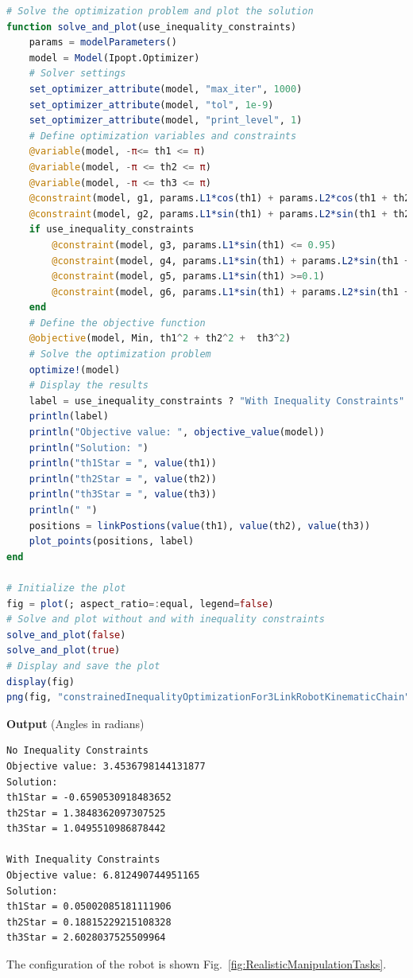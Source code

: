 \begin{lstlisting}[language=Julia,style=mystyle]
# Solve the optimization problem and plot the solution
function solve_and_plot(use_inequality_constraints)
    params = modelParameters()
    model = Model(Ipopt.Optimizer)
    # Solver settings
    set_optimizer_attribute(model, "max_iter", 1000)
    set_optimizer_attribute(model, "tol", 1e-9)
    set_optimizer_attribute(model, "print_level", 1)
    # Define optimization variables and constraints
    @variable(model, -π<= th1 <= π)
    @variable(model, -π <= th2 <= π)
    @variable(model, -π <= th3 <= π)
    @constraint(model, g1, params.L1*cos(th1) + params.L2*cos(th1 + th2) + params.L3*cos(th1 + th2 + th3) - 2.5 == 0)
    @constraint(model, g2, params.L1*sin(th1) + params.L2*sin(th1 + th2) + params.L3*sin(th1 + th2 + th3) - 0.75 == 0)
    if use_inequality_constraints
        @constraint(model, g3, params.L1*sin(th1) <= 0.95)
        @constraint(model, g4, params.L1*sin(th1) + params.L2*sin(th1 + th2) <= 0.95)
        @constraint(model, g5, params.L1*sin(th1) >=0.1)
        @constraint(model, g6, params.L1*sin(th1) + params.L2*sin(th1 + th2) >=0.1)
    end
    # Define the objective function
    @objective(model, Min, th1^2 + th2^2 +  th3^2)
    # Solve the optimization problem
    optimize!(model)
    # Display the results
    label = use_inequality_constraints ? "With Inequality Constraints" : "No Inequality Constraints"
    println(label) 
    println("Objective value: ", objective_value(model))
    println("Solution: ")
    println("th1Star = ", value(th1))
    println("th2Star = ", value(th2))
    println("th3Star = ", value(th3))
    println(" ")            
    positions = linkPostions(value(th1), value(th2), value(th3))
    plot_points(positions, label)
end

# Initialize the plot
fig = plot(; aspect_ratio=:equal, legend=false)
# Solve and plot without and with inequality constraints
solve_and_plot(false)
solve_and_plot(true)
# Display and save the plot
display(fig)
png(fig, "constrainedInequalityOptimizationFor3LinkRobotKinematicChain")

\end{lstlisting}
\textbf{Output} (Angles in radians)
\begin{verbatim}
No Inequality Constraints
Objective value: 3.4536798144131877
Solution: 
th1Star = -0.6590530918483652
th2Star = 1.3848362097307525
th3Star = 1.0495510986878442
 
With Inequality Constraints
Objective value: 6.812490744951165
Solution: 
th1Star = 0.05002085181111906
th2Star = 0.18815229215108328
th3Star = 2.6028037525509964
\end{verbatim}
The configuration of the robot is shown Fig.~\ref{fig:RealisticManipulationTasks}.

